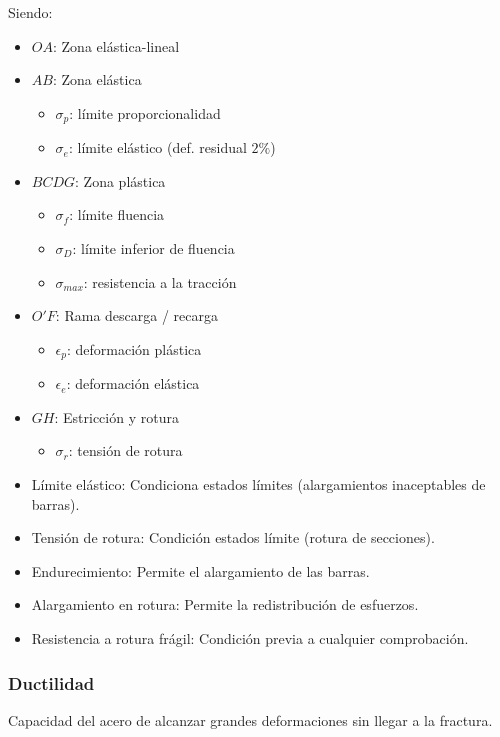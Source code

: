 Siendo:
\begin{itemize}
    \item $OA$: Zona elástica-lineal
    \item $AB$: Zona elástica
    \begin{itemize}
        \item $\sigma_p$: límite proporcionalidad
        \item $\sigma_e$: límite elástico (def. residual $2 \%$)
    \end{itemize}
    \item $BCDG$: Zona plástica
    \begin{itemize}
        \item $\sigma_f$: límite fluencia
        \item $\sigma_D$: límite inferior de fluencia
        \item $\sigma_{max}$: resistencia a la tracción
    \end{itemize}
    \item $O'F$: Rama descarga / recarga
    \begin{itemize}
        \item $\epsilon_p$: deformación plástica
        \item $\epsilon_e$: deformación elástica
    \end{itemize}
    \item $GH$: Estricción y rotura
    \begin{itemize}
        \item $\sigma_r$: tensión de rotura
    \end{itemize}
\end{itemize}

\begin{itemize}
    \item Límite elástico: Condiciona estados límites (alargamientos inaceptables de barras).
    \item Tensión de rotura: Condición estados límite (rotura de secciones).
    \item Endurecimiento: Permite el alargamiento de las barras.
    \item Alargamiento en rotura: Permite la redistribución de esfuerzos.
    \item Resistencia a rotura frágil: Condición previa a cualquier comprobación.
\end{itemize}

\subsubsection{Ductilidad}
Capacidad del acero de alcanzar grandes deformaciones sin llegar a la fractura.

